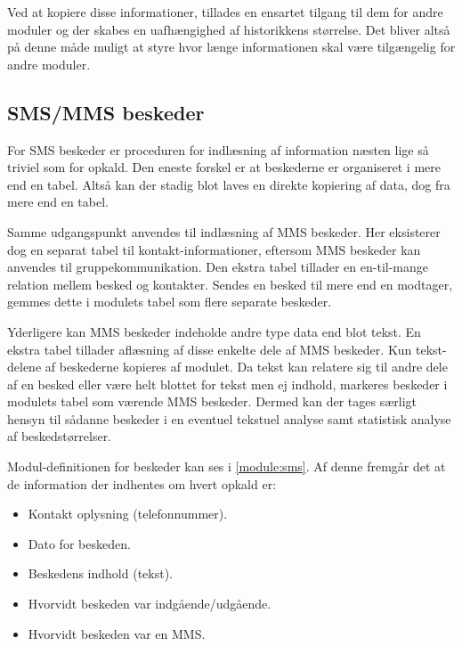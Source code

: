 Ved at kopiere disse informationer, tillades en ensartet tilgang til dem for andre moduler og der skabes en uafhængighed af historikkens størrelse.
Det bliver altså på denne måde muligt at styre hvor længe informationen skal være tilgængelig for andre moduler.



\subsection{SMS/MMS beskeder}
For SMS beskeder er proceduren for indlæsning af information næsten lige så triviel som for opkald.
Den eneste forskel er at beskederne er organiseret i mere end en tabel.
Altså kan der stadig blot laves en direkte kopiering af data, dog fra mere end en tabel.

Samme udgangspunkt anvendes til indlæsning af MMS beskeder.
Her eksisterer dog en separat tabel til kontakt-informationer, eftersom MMS beskeder kan anvendes til gruppekommunikation.
Den ekstra tabel tillader en en-til-mange relation mellem besked og kontakter.
Sendes en besked til mere end en modtager, gemmes dette i modulets tabel som flere separate beskeder.

Yderligere kan MMS beskeder indeholde andre type data end blot tekst.
En ekstra tabel tillader aflæsning af disse enkelte dele af MMS beskeder.
Kun tekst-delene af beskederne kopieres af modulet.
Da tekst kan relatere sig til andre dele af en besked eller være helt blottet for tekst men ej indhold, markeres beskeder i modulets tabel som værende MMS beskeder.
Dermed kan der tages særligt hensyn til sådanne beskeder i en eventuel tekstuel analyse samt statistisk analyse af beskedstørrelser.

Modul-definitionen for beskeder kan ses i \cref{module:sms}.
Af denne fremgår det at de information der indhentes om hvert opkald er:
\begin{itemize}
\item Kontakt oplysning (telefonnummer).
\item Dato for beskeden.
\item Beskedens indhold (tekst).
\item Hvorvidt beskeden var indgående/udgående.
\item Hvorvidt beskeden var en MMS.
\end{itemize}


